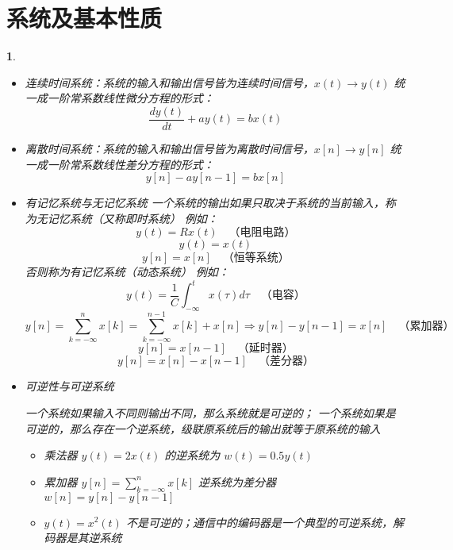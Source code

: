 \documentclass[UTF8]{report}
\theoremstyle{MyLineTheoremStyle} %
\theoremstyle{MyBlockTheoremStyle} %
\theoremstyle{MySubsubsectionStyle} %
\newtheorem{definition}{}
\begin{document}
\section{系统及基本性质}

\begin{definition}
    \begin{itemize}
        \item 连续时间系统：系统的输入和输出信号皆为连续时间信号，$x(t) \rightarrow y(t)$
        统一成一阶常系数线性微分方程的形式：
        \[
        \frac{d y(t)}{d t} + a y(t) = b x(t)
        \]

        \item 离散时间系统：系统的输入和输出信号皆为离散时间信号，$x[n] \rightarrow y[n]$
        统一成一阶常系数线性差分方程的形式：
        \[
        y[n] - a y[n - 1] = b x[n]
        \]

        \item 有记忆系统与无记忆系统
        一个系统的输出如果只取决于系统的当前输入，称为无记忆系统（又称即时系统）
        例如：
        \[
        y(t) = R x(t) \quad \text{（电阻电路）}
        \]
        \[
        y(t) = x(t)
        \]
        \[
        y[n] = x[n] \quad \text{（恒等系统）}
        \]
        否则称为有记忆系统（动态系统）
        例如：
        \[
        y(t) = \frac{1}{C} \int_{-\infty}^{t} x(\tau) d\tau \quad \text{（电容）}
        \]
        \[
        y[n] = \sum_{k=-\infty}^{n} x[k] = \sum_{k=-\infty}^{n-1} x[k] + x[n] \Rightarrow y[n] - y[n-1] = x[n] \quad \text{（累加器）}
        \]
        \[
        y[n] = x[n-1] \quad \text{（延时器）}
        \]
        \[
        y[n] = x[n] - x[n-1] \quad \text{（差分器）}
        \]

        \item 可逆性与可逆系统\par
        一个系统如果输入不同则输出不同，那么系统就是可逆的；
        一个系统如果是可逆的，那么存在一个逆系统，级联原系统后的输出就等于原系统的输入
        \begin{itemize}
            \item 乘法器 $y(t) = 2x(t)$ 的逆系统为 $w(t) = 0.5y(t)$
            \item 累加器 $y[n] = \sum_{k=-\infty}^{n} x[k]$ 逆系统为差分器 $w[n] = y[n] - y[n-1]$
            \item $y(t) = x^2(t)$ 不是可逆的；通信中的编码器是一个典型的可逆系统，解码器是其逆系统
        \end{itemize}


\end{itemize}
\end{definition}
\end{document}
